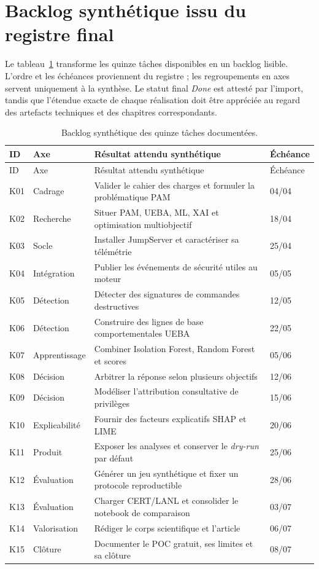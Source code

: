 \documentclass[11pt,a4paper,oneside]{report}
\theoremstyle{definition}
\theoremstyle{plain}
\begin{document}
\section{Backlog synthétique issu du registre final}

Le tableau~\ref{tab:management-backlog} transforme les quinze tâches disponibles
en un backlog lisible. L'ordre et les échéances proviennent du registre ; les
regroupements en axes servent uniquement à la synthèse. Le statut final
\emph{Done} est attesté par l'import, tandis que l'étendue exacte de chaque
réalisation doit être appréciée au regard des artefacts techniques et des
chapitres correspondants.

\begin{longtable}{@{}p{}p{}p{}p{}@{}}
\caption{Backlog synthétique des quinze tâches documentées.}
\label{tab:management-backlog}\\
\toprule
ID & Axe & Résultat attendu synthétique & Échéance \\
\midrule
\endfirsthead
\toprule
ID & Axe & Résultat attendu synthétique & Échéance \\
\midrule
\endhead
K01 & Cadrage & Valider le cahier des charges et formuler la problématique PAM & 04/04 \\
K02 & Recherche & Situer PAM, UEBA, ML, XAI et optimisation multiobjectif & 18/04 \\
K03 & Socle & Installer JumpServer et caractériser sa télémétrie & 25/04 \\
K04 & Intégration & Publier les événements de sécurité utiles au moteur & 05/05 \\
K05 & Détection & Détecter des signatures de commandes destructives & 12/05 \\
K06 & Détection & Construire des lignes de base comportementales UEBA & 22/05 \\
K07 & Apprentissage & Combiner Isolation Forest, Random Forest et scores & 05/06 \\
K08 & Décision & Arbitrer la réponse selon plusieurs objectifs & 12/06 \\
K09 & Décision & Modéliser l'attribution consultative de privilèges & 15/06 \\
K10 & Explicabilité & Fournir des facteurs explicatifs SHAP et LIME & 20/06 \\
K11 & Produit & Exposer les analyses et conserver le \emph{dry-run} par défaut & 25/06 \\
K12 & Évaluation & Générer un jeu synthétique et fixer un protocole reproductible & 28/06 \\
K13 & Évaluation & Charger CERT/LANL et consolider le notebook de comparaison & 03/07 \\
K14 & Valorisation & Rédiger le corps scientifique et l'article & 06/07 \\
K15 & Clôture & Documenter le POC gratuit, ses limites et sa clôture & 08/07 \\
\bottomrule
\end{longtable}
\end{document}
